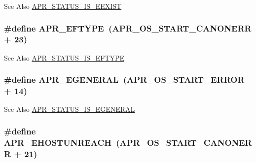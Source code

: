 \begin{DoxySeeAlso}{See Also}
\hyperlink{group___a_p_r___s_t_a_t_u_s___i_s_ga37707a0f41b084f1ce1a13575f4f21db}{A\-P\-R\-\_\-\-S\-T\-A\-T\-U\-S\-\_\-\-I\-S\-\_\-\-E\-E\-X\-I\-S\-T} 
\end{DoxySeeAlso}
\hypertarget{group___a_p_r___error_gac358701354d03c37e3f0de12ed6d9afc}{
\subsubsection[{A\-P\-R\-\_\-\-E\-F\-T\-Y\-P\-E}]{\setlength{\rightskip}{0pt plus 5cm}\#define A\-P\-R\-\_\-\-E\-F\-T\-Y\-P\-E~({\bf A\-P\-R\-\_\-\-O\-S\-\_\-\-S\-T\-A\-R\-T\-\_\-\-C\-A\-N\-O\-N\-E\-R\-R} + 23)}}\label{group___a_p_r___error_gac358701354d03c37e3f0de12ed6d9afc}
\begin{DoxySeeAlso}{See Also}
\hyperlink{group___a_p_r___s_t_a_t_u_s___i_s_gaf37f4f8f6c929728bf55b927576bdb69}{A\-P\-R\-\_\-\-S\-T\-A\-T\-U\-S\-\_\-\-I\-S\-\_\-\-E\-F\-T\-Y\-P\-E} 
\end{DoxySeeAlso}
\hypertarget{group___a_p_r___error_ga18f5678bea0c2c704a2b6a186c9e158b}{
\subsubsection[{A\-P\-R\-\_\-\-E\-G\-E\-N\-E\-R\-A\-L}]{\setlength{\rightskip}{0pt plus 5cm}\#define A\-P\-R\-\_\-\-E\-G\-E\-N\-E\-R\-A\-L~({\bf A\-P\-R\-\_\-\-O\-S\-\_\-\-S\-T\-A\-R\-T\-\_\-\-E\-R\-R\-O\-R} + 14)}}\label{group___a_p_r___error_ga18f5678bea0c2c704a2b6a186c9e158b}
\begin{DoxySeeAlso}{See Also}
\hyperlink{group___a_p_r___s_t_a_t_u_s___i_s_gab015701a084807912b3c0464c6badf1a}{A\-P\-R\-\_\-\-S\-T\-A\-T\-U\-S\-\_\-\-I\-S\-\_\-\-E\-G\-E\-N\-E\-R\-A\-L} 
\end{DoxySeeAlso}
\hypertarget{group___a_p_r___error_ga489b0c02fa7cf33ed6d698d385661f86}{
\subsubsection[{A\-P\-R\-\_\-\-E\-H\-O\-S\-T\-U\-N\-R\-E\-A\-C\-H}]{\setlength{\rightskip}{0pt plus 5cm}\#define A\-P\-R\-\_\-\-E\-H\-O\-S\-T\-U\-N\-R\-E\-A\-C\-H~({\bf A\-P\-R\-\_\-\-O\-S\-\_\-\-S\-T\-A\-R\-T\-\_\-\-C\-A\-N\-O\-N\-E\-R\-R} + 21)}}\label{group___a_p_r___error_ga489b0c02fa7cf33ed6d698d385661f86}
